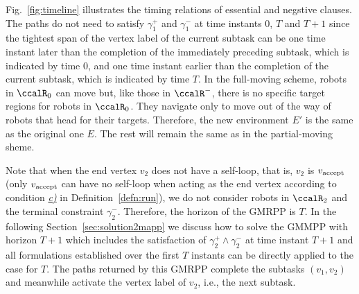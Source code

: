 \documentclass[Afour,sageh,times]{sagej}
\newcommand{\vertex}[1]{v_{\textup{#1}}}
\begin{document}
{{ Fig.~\ref{fig:timeline} illustrates the timing relations of essential and negstive clauses.  The paths do not need to satisfy  $\gamma_1^+$ and $\gamma_1^-$ at time instants 0,  $T$ and $ T+1$ since the tightest span of the vertex label of the current subtask can be one time instant later than the completion of the immediately preceding subtask, which is indicated by time 0, and one time instant earlier than the completion of the current subtask, which is indicated by time $T$. In the full-moving scheme, robots in $\ccalR_0$ can move but, like those in $\ccalR^-$, there is no specific target regions for robots in $\ccalR_0$. They  navigate only to move out of the way of robots that head for their targets. Therefore, the new environment $E'$ is the same as the original one $E$. The rest will remain the same as in the partial-moving sheme.

 Note that when the end vertex $v_2$ does not have a self-loop, that is, $v_2$ is $\vertex{accept}$ (only $\vertex{accept}$ can have no self-loop when acting as the end vertex according to condition \hyperref[cond:c]{\it c)} in Definition~\ref{defn:run}), we do not consider robots in $\ccalR_2$ and the terminal constraint $\gamma_2^-$. Therefore, the horizon of the GMRPP is $T$. In the following Section~\ref{sec:solution2mapp} we discuss how to solve the GMMPP with horizon $T+1$ which  includes the satisfaction of $\gamma_2^+\wedge \gamma_2^-$ at time instant $T+1$ and all formulations established over the first $T$ instants can be directly applied to the case for $T$.  The paths returned by this GMRPP complete the subtasks $(v_1, v_2)$  and meanwhile activate the vertex label of $v_2$, i.e., the next subtask.



}}
\end{document}
